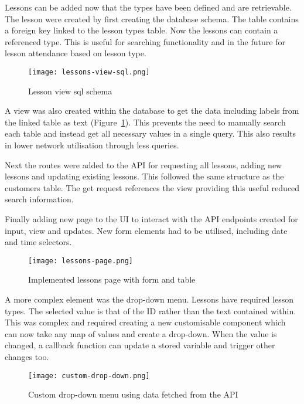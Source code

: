 Lessons can be added now that the types have been defined and are retrievable. The lesson were created by first creating the database schema. The table contains a foreign key linked to the lesson types table. Now the lessons can contain a referenced type. This is useful for searching functionality and in the future for lesson attendance based on lesson type.

\begin{figure}[ht!]
    \centerline{\texttt{[image: lessons-view-sql.png]}}
    \caption{Lesson view sql schema}
    \label{fig:lesson-view-schema-sql}
\end{figure}

A view was also created within the database to get the data including labels from the linked table as text (Figure~\ref{fig:lesson-view-schema-sql}). This prevents the need to manually search each table and instead get all necessary values in a single query. This also results in lower network utilisation through less queries.

Next the routes were added to the API for requesting all lessons, adding new lessons and updating existing lessons. This followed the same structure as the customers table. The get request references the view providing this useful reduced search information.

Finally adding new page to the UI to interact with the API endpoints created for input, view and updates. New form elements had to be utilised, including date and time selectors.

\begin{figure}[ht!]
    \centerline{\texttt{[image: lessons-page.png]}}
    \caption{Implemented lessons page with form and table}
    \label{fig:lessons-page}
\end{figure}

A more complex element was the drop-down menu. Lessons have required lesson types. The selected value is that of the ID rather than the text contained within. This was complex and required creating a new customisable component which can now take any map of values and create a drop-down. When the value is changed, a callback function can update a stored variable and trigger other changes too.

\begin{figure}[ht!]
    \centerline{\texttt{[image: custom-drop-down.png]}}
    \caption{Custom drop-down menu using data fetched from the API}
    \label{fig:drop-down}
\end{figure}


